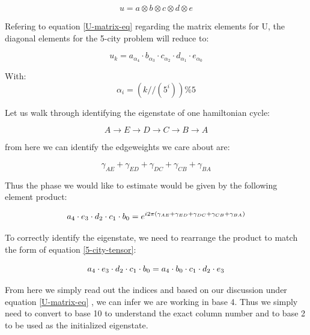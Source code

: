 \documentclass[msc,oneside]{ubcthesis}
\begin{document}
	$$ u = a \otimes b \otimes c \otimes d \otimes e$$
	
	
	Refering to equation \ref{U-matrix-eq} regarding the matrix elements for U,  the diagonal elements for the 5-city problem will reduce to:
	
	\begin{equation}\label{5-city-tensor}
		u_{k} = a_{\alpha_{4}}\cdot b _{\alpha_{3}} \cdot c_{\alpha_2} \cdot d_{\alpha_{1}}\cdot e_{\alpha_{0}}
	\end{equation}
	
	With: $$\alpha_i = \left(k//\left(5^{i}\right)\right) \% 5$$
	
	
	\vspace{0.5cm}
	
	Let us walk through identifying the eigenstate of one hamiltonian cycle:
	
	\begin{equation}\label{one-ham-cycle-4-city}
		A \rightarrow E \rightarrow D \rightarrow C \rightarrow B \rightarrow A
	\end{equation}
	
	from here we can identify the edgeweights we care about are:
	
	\begin{equation*}
		\gamma_{AE} + \gamma_{ED} + \gamma_{DC} + \gamma_{CB} + \gamma_{BA}
	\end{equation*}
	
	Thus the phase we would like to estimate would be given by the following element product:
	
	\begin{equation*}
		\Large{a_{4} \cdot e_{3} \cdot d_{2} \cdot c_{1} \cdot b_{0} = e^{i2\pi (\gamma_{AE} + \gamma_{ED} + \gamma_{DC} + \gamma_{CB} + \gamma_{BA})}}
	\end{equation*}
	
	
	To correctly identify the eigenstate, we need to rearrange the product to match the form of equation \ref{5-city-tensor}:
	
	\begin{equation*}
		\Large{a_{4} \cdot e_{3} \cdot d_{2} \cdot c_{1} \cdot b_{0}= a_{4} \cdot b_{0}  \cdot c_{1}\cdot d_{2} \cdot e_{3}}
	\end{equation*}
	
	From here we simply read out the indices and based on our discussion under equation \ref{U-matrix-eq} , we can infer we are working in base 4. Thus we simply need to convert to base 10 to understand the exact column number and to base 2 to be used as the initialized eigenstate.
	
\end{document}
